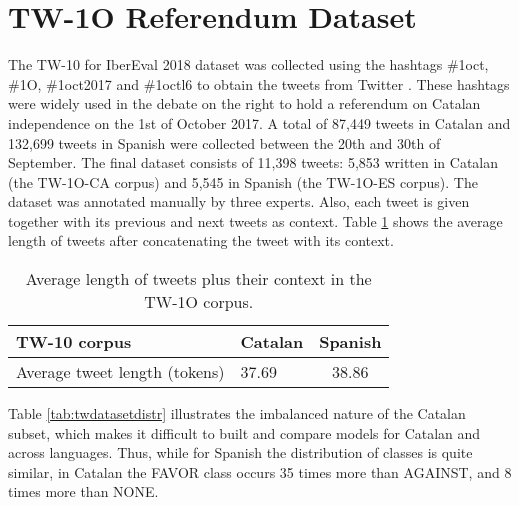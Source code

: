 \documentclass[10pt, a4paper]{article}
\begin{document}
\section{TW-1O Referendum Dataset}\label{sec:tw1o_dataset}

The TW-10 for IberEval 2018 dataset was collected using the hashtags \#1oct, \#1O, \#1oct2017 and \#1octl6 to obtain the tweets from Twitter \cite{taule18}. These hashtags were widely used in the debate on the right to hold a referendum on Catalan independence on the 1st of October 2017. A total of 87,449 tweets in Catalan and 132,699 tweets in Spanish were collected between the 20th and 30th of September. The final dataset consists of 11,398 tweets: 5,853 written in Catalan (the TW-1O-CA corpus) and 5,545 in Spanish (the TW-1O-ES corpus). The dataset was annotated manually by three experts. Also, each tweet is given together with its previous and next tweets as context. Table \ref{tab:length_tw_dataset} shows the average length of tweets after concatenating the tweet with its context.

\begin{table}[!ht]
\begin{tabular}{llc} \hline
  TW-10 corpus & Catalan & Spanish \\ \hline
  Average tweet length (tokens) & 37.69 & 38.86\\ \hline
\end{tabular}
\caption{Average length of tweets plus their context in the TW-1O corpus.}\label{tab:length_tw_dataset}
\end{table}







Table \ref{tab:twdatasetdistr} illustrates the imbalanced nature of the Catalan subset, which makes it difficult to built and compare models for Catalan and across languages. Thus, while for Spanish the distribution of classes is quite similar, in Catalan the FAVOR class occurs 35 times more than AGAINST, and 8 times more than NONE.
\end{document}
